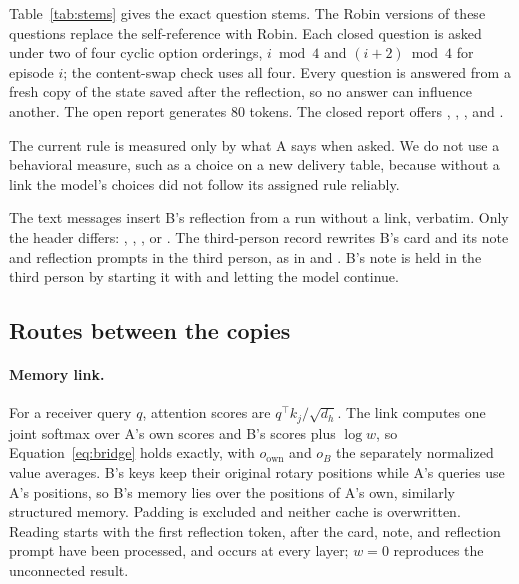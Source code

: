 Table~\ref{tab:stems} gives the exact question stems. The Robin versions
of these questions replace the self-reference with Robin. Each closed
question is asked under two of four cyclic option orderings, $i\bmod4$
and $(i+2)\bmod4$ for episode $i$; the content-swap check uses all four.
Every question is answered from a fresh copy of the state saved after
the reflection, so no answer can influence another. The open report
generates 80 tokens. The closed report offers , , , and .

The current rule is measured only by what A says when asked. We do not
use a behavioral measure, such as a choice on a new delivery table,
because without a link the model's choices did not follow its assigned
rule reliably.

The text messages insert B's reflection from a run without a link,
verbatim. Only the header differs: ,
, ,
or . The third-person record
rewrites B's card and its note and reflection prompts in the third
person, as in  and
. B's note is held in the third
person by starting it with  and letting the
model continue.

\subsection{Routes between the copies}
\label{app:routes}

\paragraph{Memory link.}
For a receiver query $q$, attention scores are $q^\top k_j/\sqrt{d_h}$.
The link computes one joint softmax over A's own scores and B's scores
plus $\log w$, so Equation~\ref{eq:bridge} holds exactly, with
$o_{\mathrm{own}}$ and $o_B$ the separately normalized value averages.
B's keys keep their original rotary positions while A's queries use A's
positions, so B's memory lies over the positions of A's own, similarly
structured memory. Padding is excluded and neither cache is overwritten. Reading starts with the first reflection token, after the card, note, and reflection prompt have been processed, and occurs at every layer;
$w=0$ reproduces the unconnected result.

